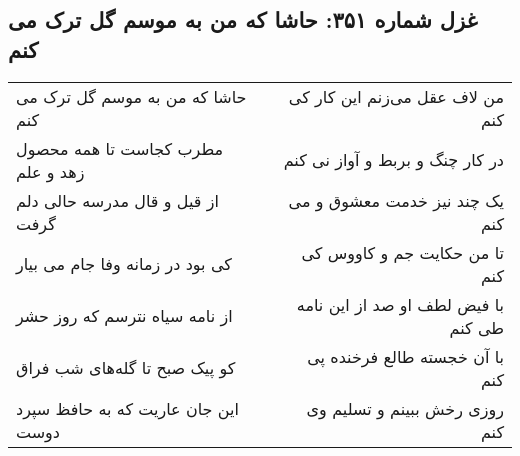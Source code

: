 \begin{center}
\section*{غزل شماره ۳۵۱: حاشا که من به موسم گل ترک می کنم}
\label{sec:sh351}
\begin{longtable}{l p{0.5cm} r}
حاشا که من به موسم گل ترک می کنم
&&
من لاف عقل می‌زنم این کار کی کنم
\\
مطرب کجاست تا همه محصول زهد و علم
&&
در کار چنگ و بربط و آواز نی کنم
\\
از قیل و قال مدرسه حالی دلم گرفت
&&
یک چند نیز خدمت معشوق و می کنم
\\
کی بود در زمانه وفا جام می بیار
&&
تا من حکایت جم و کاووس کی کنم
\\
از نامه سیاه نترسم که روز حشر
&&
با فیض لطف او صد از این نامه طی کنم
\\
کو پیک صبح تا گله‌های شب فراق
&&
با آن خجسته طالع فرخنده پی کنم
\\
این جان عاریت که به حافظ سپرد دوست
&&
روزی رخش ببینم و تسلیم وی کنم
\\
\end{longtable}
\end{center}
